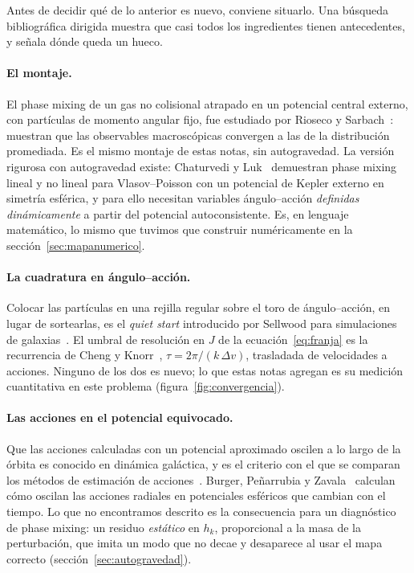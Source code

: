 \documentclass[11pt,a4paper]{article}
\newcommand{\Jr}{J}
\theoremstyle{definition}
\begin{document}
Antes de decidir qué de lo anterior es nuevo, conviene situarlo. Una búsqueda
bibliográfica dirigida muestra que casi todos los ingredientes tienen antecedentes, y
señala dónde queda un hueco.

\paragraph{El montaje.} El phase mixing de un gas no colisional atrapado en un
potencial central externo, con partículas de momento angular fijo, fue estudiado por
Rioseco y Sarbach~\cite{rioseco2020}: muestran que las observables macroscópicas
convergen a las de la distribución promediada. Es el mismo montaje de estas notas,
sin autogravedad. La versión rigurosa con autogravedad existe: Chaturvedi y
Luk~\cite{chaturvedi2024} demuestran phase mixing lineal y no lineal para
Vlasov--Poisson con un potencial de Kepler externo en simetría esférica, y para ello
necesitan variables ángulo--acción \emph{definidas dinámicamente} a partir del
potencial autoconsistente. Es, en lenguaje matemático, lo mismo que tuvimos que
construir numéricamente en la sección~\ref{sec:mapanumerico}.

\paragraph{La cuadratura en ángulo--acción.} Colocar las partículas en una rejilla
regular sobre el toro de ángulo--acción, en lugar de sortearlas, es el
\emph{quiet start} introducido por Sellwood para simulaciones de galaxias~\cite{sellwood1997}.
El umbral de resolución en $\Jr$ de la ecuación~\eqref{eq:franja} es la recurrencia
de Cheng y Knorr~\cite{chengknorr1976}, $\tau=2\pi/(k\,\Delta v)$, trasladada de
velocidades a acciones. Ninguno de los dos es nuevo; lo que estas notas agregan es
su medición cuantitativa en este problema (figura~\ref{fig:convergencia}).

\paragraph{Las acciones en el potencial equivocado.} Que las acciones calculadas con
un potencial aproximado oscilen a lo largo de la órbita es conocido en dinámica
galáctica, y es el criterio con el que se comparan los métodos de estimación de
acciones~\cite{sanders2016}. Burger, Peñarrubia y Zavala~\cite{burger2021} calculan
cómo oscilan las acciones radiales en potenciales esféricos que cambian con el
tiempo. Lo que no encontramos descrito es la consecuencia para un diagnóstico de
phase mixing: un residuo \emph{estático} en $h_k$, proporcional a la masa de la
perturbación, que imita un modo que no decae y desaparece al usar el mapa correcto
(sección~\ref{sec:autogravedad}).
\end{document}
